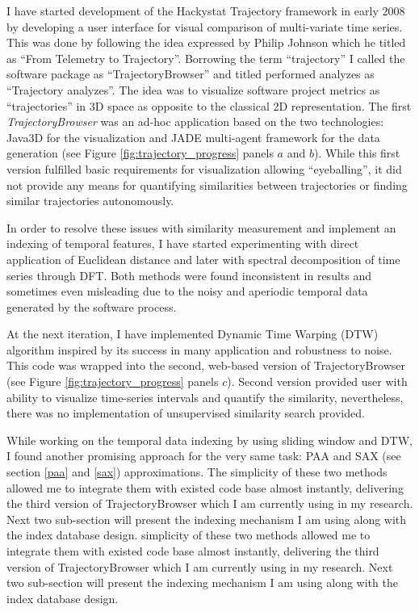 I have started development of the Hackystat Trajectory framework in early 2008 by developing a user interface for visual comparison of multi-variate time series. This was done by following the idea expressed by Philip Johnson which he titled as ``From Telemetry to Trajectory''. Borrowing the term ``trajectory'' I called the software package as ``TrajectoryBrowser'' and titled performed analyzes as ``Trajectory analyzes''. The idea was to visualize software project metrics as ``trajectories'' in 3D space as opposite to the classical 2D representation. The first \textit{TrajectoryBrowser} was an ad-hoc application based on the two technologies: Java3D for the visualization and JADE multi-agent framework \cite{citeulike:1230319} for the data generation (see Figure \ref{fig:trajectory_progress} panels $a$ and $b$). While this first version fulfilled basic requirements for visualization allowing ``eyeballing'', it did not provide any means for quantifying similarities between trajectories or finding similar trajectories autonomously.

In order to resolve these issues with similarity measurement and implement an indexing of temporal features, I have started experimenting with direct application of Euclidean distance and later with spectral decomposition of time series through DFT. Both methods were found inconsistent in results and sometimes even misleading due to the noisy and aperiodic temporal data generated by the software process. 

At the next iteration, I have implemented Dynamic Time Warping (DTW) algorithm inspired by its success in many application and robustness to noise. This code was wrapped into the second, web-based version of TrajectoryBrowser (see Figure \ref{fig:trajectory_progress} panels $c$). Second version provided user with ability to visualize time-series intervals and quantify the similarity, nevertheless, there was no implementation of unsupervised similarity search provided.

While working on the temporal data indexing by using sliding window and DTW, I found another promising approach for the very same task: PAA and SAX (see section \ref{paa} and \ref{sax}) approximations. The simplicity of these two methods allowed me to integrate them with existed code base almost instantly, delivering the third version of TrajectoryBrowser which I am currently using in my research. Next two sub-section will present the indexing mechanism I am using along with the index database design. simplicity of these two methods allowed me to integrate them with existed code base almost instantly, delivering the third version of TrajectoryBrowser which I am currently using in my research. Next two sub-section will present the indexing mechanism I am using along with the index database design.

